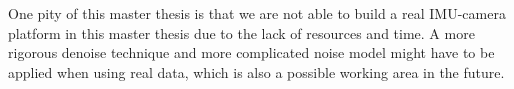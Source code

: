 One pity of this master thesis is that we are not able to build a real IMU-camera platform in this master thesis due to the lack of resources and time. A more rigorous denoise technique and more complicated noise model might have to be applied when using real data, which is also a possible working area in the future.

